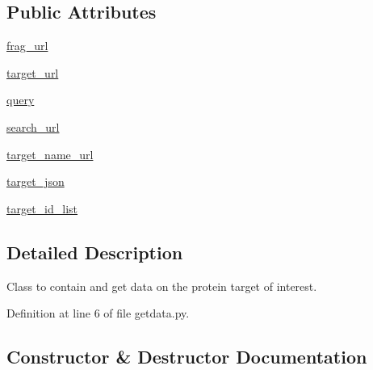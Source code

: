 \subsection*{Public Attributes}
\begin{DoxyCompactItemize}
\item 
\hyperlink{classfragalysis__api_1_1xcextracter_1_1getdata_1_1_get_targets_data_afa8f34da2572edae8988c21829ce9c3e}{frag\+\_\+url}
\item 
\hyperlink{classfragalysis__api_1_1xcextracter_1_1getdata_1_1_get_targets_data_a7c14c7714ad794c49aa6354d47afdeba}{target\+\_\+url}
\item 
\hyperlink{classfragalysis__api_1_1xcextracter_1_1getdata_1_1_get_targets_data_a3dffd252e6a0bbed273a8e6dbb6de886}{query}
\item 
\hyperlink{classfragalysis__api_1_1xcextracter_1_1getdata_1_1_get_targets_data_a16daab7bc18679ec7c933297616a29ca}{search\+\_\+url}
\item 
\hyperlink{classfragalysis__api_1_1xcextracter_1_1getdata_1_1_get_targets_data_a062afec53b3ec29811563ff02653de1b}{target\+\_\+name\+\_\+url}
\item 
\hyperlink{classfragalysis__api_1_1xcextracter_1_1getdata_1_1_get_targets_data_a1978182ff74a964745ff788a25760b21}{target\+\_\+json}
\item 
\hyperlink{classfragalysis__api_1_1xcextracter_1_1getdata_1_1_get_targets_data_aa58b4659be6811ef194daf3f3cab74a2}{target\+\_\+id\+\_\+list}
\end{DoxyCompactItemize}


\subsection{Detailed Description}
Class to contain and get data on the protein target of interest. 

Definition at line 6 of file getdata.\+py.



\subsection{Constructor \& Destructor Documentation}
\mbox{\label{classfragalysis__api_1_1xcextracter_1_1getdata_1_1_get_targets_data_a40260f1d84f75c354f8b1b7124732b3a}} 
